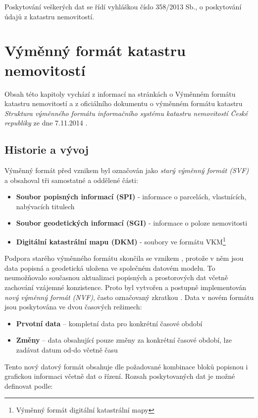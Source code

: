Poskytování veškerých dat se řídí vyhláškou číslo 358/2013 Sb., o
poskytování údajů z katastru nemovitostí.
\section{Výměnný formát katastru nemovitostí}
Obsah této kapitoly vychází z informací na stránkách  o
Výměnném formátu katastru nemovitostí a z oficiálního dokumentu o
výměnném formátu katastru \textit{Struktura výměnného formátu
  informačního systému katastru nemovitostí České republiky} ze dne
7.11.2014 \cite{struktura_ISKN}.
\subsection{Historie a vývoj}
Výměnný formát před vznikem  byl označován jako \textit{starý
  výměnný formát (SVF)} a obsahoval tři samostatné a oddělené části:
\begin{itemize}[leftmargin=50pt]
	\item \textbf{Soubor popisných informací (SPI)} - informace o parcelách, vlastnících, nabývacích titulech
	\item \textbf{Soubor geodetických informací (SGI)} - informace o poloze nemovitosti
	\item \textbf{Digitální katastrální mapu (DKM)} - soubory ve formátu VKM\footnote{Výměnný formát digitální katastrální mapy}
\end{itemize}
Podpora starého výměnného formátu skončila se vznikem ,
protože v něm jsou data popisná a geodetická uložena ve společném
datovém modelu. To neumožňovalo současnou aktualizaci popisných a
prostorových dat včetně zachování vzájemné konzistence. Proto byl
vytvořen a postupně implementován \textit{nový výměnný formát (NVF)},
často označovaný zkratkou . Data v novém formátu jsou
poskytována ve dvou časových režimech:

\begin{itemize}[leftmargin=50pt]
\item \textbf{Prvotní data} -- kompletní data pro konkrétní časové období						
\item \textbf{Změny} -- data obsahující pouze změny za konkrétní časové období, lze zadávat datum od-do včetně času					 
\end{itemize}
Tento nový datový formát obsahuje dle požadované kombinace bloků
popisnou i grafickou informaci včetně dat o řízení. Rozsah
poskytovaných dat je možné definovat podle:

